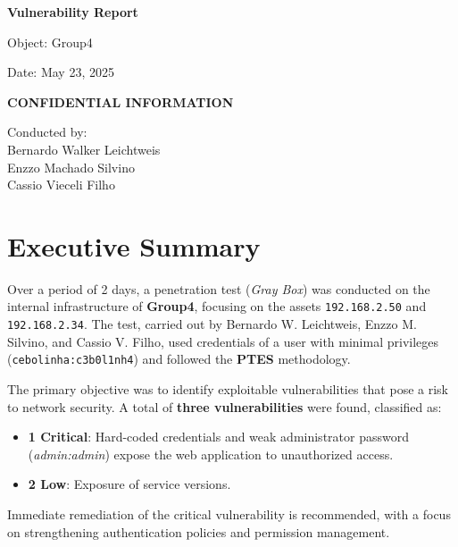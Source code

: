 \documentclass[a4paper,12pt]{article}
\begin{document}
\pagestyle{fancy}


\begin{titlepage}
    \centering
    \vspace*{2cm}
    {\Huge\bfseries Vulnerability Report\par}
    \vspace{1cm}
    {\Large Object: Group4\par}
    {\Large Date: May 23, 2025\par}
    \vspace{0.5cm}
    {\large\bfseries CONFIDENTIAL INFORMATION\par}
    \vspace{2cm}
    {\large Conducted by: \\ Bernardo Walker Leichtweis \\ Enzzo Machado Silvino \\ Cassio Vieceli Filho\par}
\end{titlepage}

\tableofcontents
\clearpage

\section{Executive Summary}
Over a period of 2 days, a penetration test (\textit{Gray Box}) was conducted on the internal infrastructure of \textbf{Group4}, focusing on the assets \texttt{192.168.2.50} and \texttt{192.168.2.34}. The test, carried out by Bernardo W. Leichtweis, Enzzo M. Silvino, and Cassio V. Filho, used credentials of a user with minimal privileges (\texttt{cebolinha:c3b0l1nh4}) and followed the \textbf{PTES} methodology.

The primary objective was to identify exploitable vulnerabilities that pose a risk to network security. A total of \textbf{three vulnerabilities} were found, classified as:
\begin{itemize}
    \item \textbf{1 Critical}: Hard-coded credentials and weak administrator password (\textit{admin:admin}) expose the web application to unauthorized access.
    \item \textbf{2 Low}: Exposure of service versions.
\end{itemize}

Immediate remediation of the critical vulnerability is recommended, with a focus on strengthening authentication policies and permission management.
\end{document}
